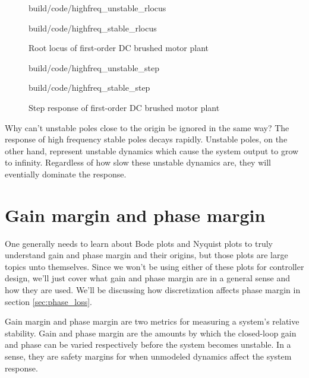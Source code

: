 \begin{figure}
  \begin{minisvg}{build/code/highfreq_unstable_rlocus}
    \caption{Root locus of second-order DC brushed motor plant}
    \label{fig:highfreq_unstable_rlocus}
  \end{minisvg}
  \begin{minisvg}{build/code/highfreq_stable_rlocus}
    \caption{Root locus of first-order DC brushed motor plant}
    \label{fig:highfreq_stable_rlocus}
  \end{minisvg}
\end{figure}

\begin{figure}
  \begin{minisvg}{build/code/highfreq_unstable_step}
    \caption{Step response of second-order DC brushed motor plant}
    \label{fig:highfreq_unstable_step}
  \end{minisvg}
  \begin{minisvg}{build/code/highfreq_stable_step}
    \caption{Step response of first-order DC brushed motor plant}
    \label{fig:highfreq_stable_step}
  \end{minisvg}
\end{figure}

Why can't unstable poles close to the origin be ignored in the same way? The
response of high frequency stable poles decays rapidly. Unstable poles, on the
other hand, represent unstable dynamics which cause the system output to grow to
infinity. Regardless of how slow these unstable dynamics are, they will
eventially dominate the response.

\section{Gain margin and phase margin} \label{sec:gain-phase-margin}

One generally needs to learn about Bode plots and Nyquist plots to truly
understand gain and phase margin and their origins, but those plots are large
topics unto themselves. Since we won't be using either of these plots for
controller design, we'll just cover what gain and phase margin are in a general
sense and how they are used. We'll be discussing how discretization affects
phase margin in section \ref{sec:phase_loss}.

Gain margin and phase margin are two metrics for measuring a system's relative
stability. Gain and phase margin are the amounts by which the closed-loop gain
and phase can be varied respectively before the system becomes unstable. In a
sense, they are safety margins for when unmodeled dynamics affect the system
response.

